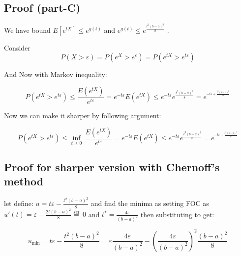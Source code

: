 \documentclass[
]{article}
\begin{document}
\hypertarget{proof-part-c}{%
\subsection{Proof (part-C)}\label{proof-part-c}}

We have bound
\(E\left[ {{e}^{tX}} \right]\le {{e}^{g\left( t \right)}}\) and
\({{e}^{g\left( t \right)}}\le {{e}^{\frac{{{t}^{2}}{{\left( b-a \right)}^{2}}}{8}}}\)
.

Consider
\[P\left( X>\varepsilon  \right)=P\left( {{e}^{X}}>{{e}^{\varepsilon }} \right)=P\left( {{e}^{tX}}>{{e}^{t\varepsilon }} \right)\]

And Now with Markov inequality:

\[P\left( {{e}^{tX}}>{{e}^{t\varepsilon }} \right)\le \frac{E\left( {{e}^{tX}} \right)}{{{e}^{t\varepsilon }}}={{e}^{-t\varepsilon }}E\left( {{e}^{tX}} \right)\le {{e}^{-t\varepsilon }}{{e}^{\frac{{{t}^{2}}{{\left( b-a \right)}^{2}}}{8}}}={{e}^{^{-t\varepsilon +\frac{{{t}^{2}}{{\left( b-a \right)}^{2}}}{8}}}}\]

Now we can make it sharper by following argument:

\[P\left( {{e}^{tX}}>{{e}^{t\varepsilon }} \right)\le \underset{t\ge 0}{\mathop{\inf }}\,\frac{E\left( {{e}^{tX}} \right)}{{{e}^{t\varepsilon }}}={{e}^{-t\varepsilon }}E\left( {{e}^{tX}} \right)\le {{e}^{-t\varepsilon }}{{e}^{\frac{{{t}^{2}}{{\left( b-a \right)}^{2}}}{8}}}={{e}^{^{-t\varepsilon +\frac{{{t}^{2}}{{\left( b-a \right)}^{2}}}{8}}}}\]

\hypertarget{proof-for-sharper-version-with-chernoffs-method}{%
\subsection{Proof for sharper version with Chernoff's
method}\label{proof-for-sharper-version-with-chernoffs-method}}

let define:
\(u=t\varepsilon -\frac{{{t}^{2}}{{\left( b-a \right)}^{2}}}{8}\) and
find the minima as setting FOC as
\({u}'\left( t \right)=\varepsilon -\frac{2t{{\left( b-a \right)}^{2}}}{8}\overset{set}{\mathop{=}}\,0\)
and \({{t}^{*}}=\frac{4\varepsilon }{{{\left( b-a \right)}^{2}}}\) then
substituting to get:

\[{{u}_{\min }}=t\varepsilon -\frac{{{t}^{2}}{{\left( b-a \right)}^{2}}}{8}=\varepsilon \frac{4\varepsilon }{{{\left( b-a \right)}^{2}}}-{{\left( \frac{4\varepsilon }{{{\left( b-a \right)}^{2}}} \right)}^{2}}\frac{{{\left( b-a \right)}^{2}}}{8}\]
\end{document}
